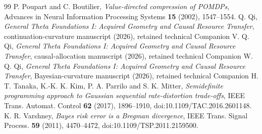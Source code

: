 \begin{thebibliography}{99}
 P. Poupart and C. Boutilier, \emph{Value-directed compression of POMDPs}, Advances in Neural Information Processing Systems \textbf{15} (2002), 1547--1554.
 Q. Qi, \emph{General Theta Foundations I: Acquired Geometry and Causal Resource Transfer}, continuation-curvature manuscript (2026), retained technical Companion V.
 Q. Qi, \emph{General Theta Foundations I: Acquired Geometry and Causal Resource Transfer}, causal-allocation manuscript (2026), retained technical Companion W.
 Q. Qi, \emph{General Theta Foundations I: Acquired Geometry and Causal Resource Transfer}, Bayesian-curvature manuscript (2026), retained technical Companion H.
 T. Tanaka, K.-K. K. Kim, P. A. Parrilo and S. K. Mitter, \emph{Semidefinite programming approach to Gaussian sequential rate-distortion trade-offs}, IEEE Trans. Automat. Control \textbf{62} (2017), 1896--1910, doi:10.1109/TAC.2016.2601148.
 K. R. Varshney, \emph{Bayes risk error is a Bregman divergence}, IEEE Trans. Signal Process. \textbf{59} (2011), 4470--4472, doi:10.1109/TSP.2011.2159500.
\end{thebibliography}

